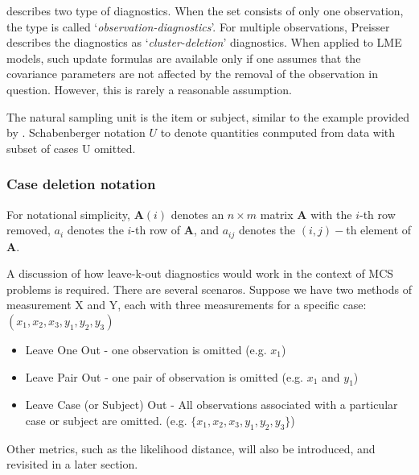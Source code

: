\documentclass[12pt, a4paper]{report}
\theoremstyle{plain}
\theoremstyle{definition}
\theoremstyle{remark}
\begin{document}
\citet{preisser} describes two type of diagnostics. When the set consists of only one observation, the type is called
`\textit{observation-diagnostics}'. For multiple observations, Preisser describes the diagnostics as `\textit{cluster-deletion}' diagnostics. When applied to LME models, such update formulas are available only if one assumes that the covariance parameters are not affected by the removal of the observation in question. However, this is rarely a reasonable assumption.



The natural sampling unit is the item or subject, similar to the example provided by \citet{schabenberger}. 
Schabenberger notation $U$ to denote quantities conmputed from data with subset of cases U omitted.


\subsubsection{Case deletion notation} 

For notational simplicity, $\boldsymbol{A}(i)$ denotes an $n \times m$ matrix $\boldsymbol{A}$ with the $i$-th row
removed, $a_i$ denotes the $i$-th row of $\boldsymbol{A}$, and $a_{ij}$ denotes the $(i, j)-$th element of $\boldsymbol{A}$.

A discussion of how leave-k-out diagnostics would work in the context of MCS problems is required. There are several scenaros. Suppose we have two methods of measurement X and Y, each with three measurements for a specific case: $(x_1,x_2,x_3,y_1,y_2,y_3)$

\begin{itemize}
	\item Leave One Out - one observation is omitted (e.g. $x_1$)
	\item Leave Pair Out - one pair of observation  is omitted (e.g. $x_1$ and $y_1$)
	\item Leave Case (or Subject) Out - All observations associated with a particular case or subject are omitted. (e.g. $\{x_1,x_2,x_3,y_1,y_2,y_3\}$)
\end{itemize}
Other metrics, such as the likelihood distance, will also be introduced, and revisited in a later section.
\end{document}

